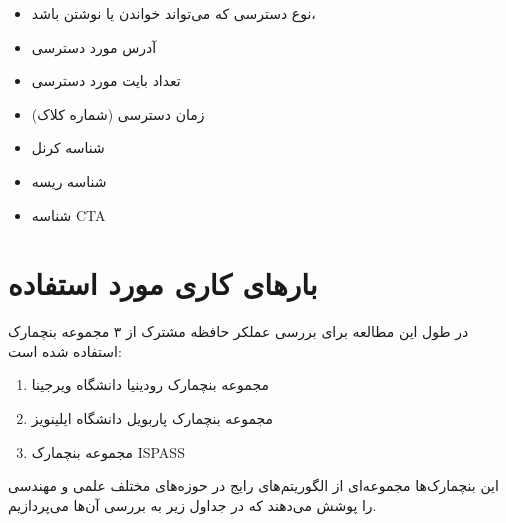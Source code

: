\documentclass{thesis}
\begin{document}
\begin{itemize}
\item نوع دسترسی که می‌تواند
خواندن یا نوشتن باشد،
\item
آدرس مورد دسترسی
\item
تعداد بایت مورد دسترسی
\item
زمان دسترسی (شماره کلاک)
\item
شناسه کرنل 
\item
شناسه ریسه
\item
شناسه
CTA
\end{itemize}

\section{
بارهای کاری مورد استفاده
}

در طول این مطالعه برای بررسی عملکر حافظه مشترک از ۳ مجموعه بنچمارک
استفاده شده است:
\begin{enumerate}
\item 
مجموعه
بنچمارک
رودینیا
دانشگاه ویرجینا
\item
مجموعه بنچمارک
پاربویل
دانشگاه
ایلینویز
\item
مجموعه بنچمارک
ISPASS
\end{enumerate}

این بنچمارک‌ها مجموعه‌ای از الگوریتم‌های رایج در حوزه‌های مختلف علمی و مهندسی
را پوشش می‌دهند که در جداول زیر به بررسی آن‌ها می‌پردازیم.
\end{document}
